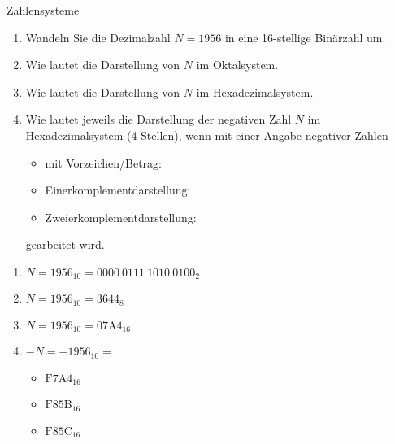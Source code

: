 \documentclass{article}
\author{Leopold Lemmermann}
\begin{document}
\createtitle

\begin{exercise}{Zahlensysteme}
  \begin{enumerate}
    \item Wandeln Sie die Dezimalzahl $N = 1956$ in eine 16-stellige Binärzahl um.
    \item Wie lautet die Darstellung von $N$ im Oktalsystem.
    \item Wie lautet die Darstellung von $N$ im Hexadezimalsystem.
    \item Wie lautet jeweils die Darstellung der negativen Zahl $N$ im Hexadezimalsystem (4 Stellen), wenn mit einer Angabe negativer Zahlen
          \begin{itemize}
            \item mit Vorzeichen/Betrag:
            \item Einerkomplementdarstellung:
            \item Zweierkomplementdarstellung:
          \end{itemize}
          gearbeitet wird.
  \end{enumerate}

  \begin{solution}
    \begin{enumerate}
      \item $N = 1956_{10} = {0000\ 0111\ 1010\ 0100}_2$
      \item $N = 1956_{10} = {3644}_8$
      \item $N = 1956_{10} = {\mathrm{07A4}}_{16}$
      \item $-N = -1956_{10} = $
            \begin{itemize}
              \item ${\mathrm{F7A4}}_{16}$
              \item ${\mathrm{F85B}}_{16}$
              \item ${\mathrm{F85C}}_{16}$
            \end{itemize}
    \end{enumerate}
  \end{solution}
\end{exercise}
\end{document}
